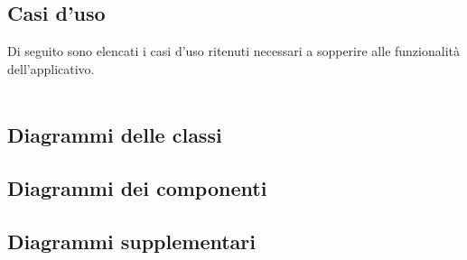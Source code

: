 \subsection{Casi d'uso}
Di seguito sono elencati i casi d'uso ritenuti necessari a sopperire alle funzionalità
dell'applicativo.
\\\\





\pagebreak


\pagebreak
\subsection{Diagrammi delle classi}





\pagebreak
\subsection{Diagrammi dei componenti}


\pagebreak
\subsection{Diagrammi supplementari}

\pagebreak

\pagebreak

